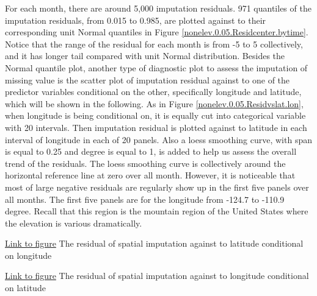 For each month, there are around 5,000 imputation residuals. 971 quantiles of the
imputation residuals, from 0.015 to 0.985, are plotted against to their corresponding 
unit Normal quantiles in Figure 
\href{../plots/a1950/spaimpute/nonelev/span0.05/a1950.spaResidcenter.bytime.pdf}
{\ref*{nonelev.0.05.Residcenter.bytime}}. Notice that the range of the residual
for each month is from -5 to 5 collectively, and it has longer tail compared with
unit Normal distribution. Besides the Normal quantile plot, another type of 
diagnostic plot to assess the imputation of missing value is the scatter plot of
imputation residual against to one of the predictor variables conditional on the
other, specifically longitude and latitude, which will be shown in the following. 
As in Figure
\href{../plots/a1950/spaimpute/nonelev/span0.05/a1950.spaResid.vs.lat.lon.pdf}
{\ref*{nonelev.0.05.Residvslat.lon}}, when longitude is being conditional on, it
is equally cut into categorical variable with 20 intervals. Then imputation 
residual is plotted against to latitude in each interval of longitude in each of
20 panels. Also a loess smoothing curve, with span is equal to 0.25 and degree is
equal to 1, is added to help us assess the overall trend of the residuals. The 
loess smoothing curve is collectively around the horizontal reference line at zero
over all month. However, it is noticeable that most of large negative residuals are
regularly show up in the first five panels over all months. The first five panels
are for the longitude from -124.7 to -110.9 degree. Recall that this region is
the mountain region of the United States where the elevation is various dramatically.



\begin{framed}
\begin{center}
  \href{../plots/a1950/spaimpute/nonelev/span0.05/a1950.spaResid.vs.lat.lon.pdf}
  {Link to figure}
  {The residual of spatial imputation against to latitude conditional on longitude}
  \label{nonelev.0.05.Residvslat.lon}
\end{center}
\end{framed}

\begin{framed}
\begin{center}
  \href{../plots/a1950/spaimpute/nonelev/span0.05/a1950.spaResid.vs.lon.lat.pdf}
  {Link to figure}
  {The residual of spatial imputation against to longitude conditional on latitude}
  \label{nonelev.0.05.Residvslon.lat}
\end{center}
\end{framed}

